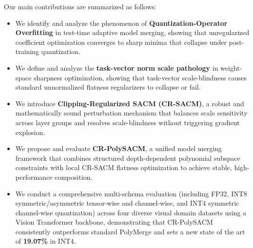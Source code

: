 Our main contributions are summarized as follows:
\begin{itemize}
    \item We identify and analyze the phenomenon of \textbf{Quantization-Operator Overfitting} in test-time adaptive model merging, showing that unregularized coefficient optimization converges to sharp minima that collapse under post-training quantization.
    \item We define and analyze the \textbf{task-vector norm scale pathology} in weight-space sharpness optimization, showing that task-vector scale-blindness causes standard unnormalized flatness regularizers to collapse or fail.
    \item We introduce \textbf{Clipping-Regularized SACM (CR-SACM)}, a robust and mathematically sound perturbation mechanism that balances scale sensitivity across layer groups and resolves scale-blindness without triggering gradient explosion.
    \item We propose and evaluate \textbf{CR-PolySACM}, a unified model merging framework that combines structured depth-dependent polynomial subspace constraints with local CR-SACM flatness optimization to achieve stable, high-performance composition.
    \item We conduct a comprehensive multi-schema evaluation (including FP32, INT8 symmetric/asymmetric tensor-wise and channel-wise, and INT4 symmetric channel-wise quantization) across four diverse visual domain datasets using a Vision Transformer backbone, demonstrating that CR-PolySACM consistently outperforms standard PolyMerge and sets a new state of the art of \textbf{19.07\%} in INT4.
\end{itemize}
